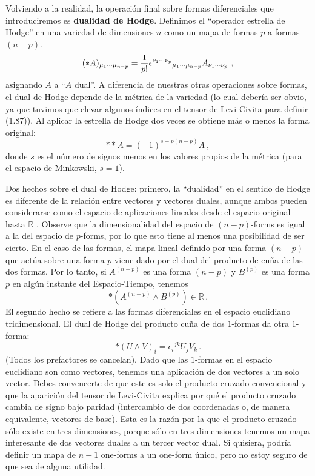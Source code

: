 \documentclass[11pt,b5paper,openany,twoside]{book}
\begin{document}
Volviendo a la realidad, la operación final sobre formas diferenciales que introduciremos es {\bf dualidad de Hodge}.
Definimos el ``operador estrella de Hodge'' en una variedad de dimensiones $n$ como un mapa de formas $p$ a formas $(n-p)$.
\begin{equation}
(*A)_{\mu_1\cdots\mu_{n-p}} = {1\over {p!}}
\epsilon^{\nu_1\cdots\nu_p}{}_{\mu_1\cdots\mu_{n-p}}
A_{\nu_1\cdots\nu_p}\ ,\label{1.87}
\end{equation}
asignando $A$ a ``$A$ dual''.
A diferencia de nuestras otras operaciones sobre formas, el dual de Hodge depende de la métrica de la variedad (lo cual debería ser obvio, ya que tuvimos que elevar algunos índices en el tensor de Levi-Civita para definir (1.87)).
Al aplicar la estrella de Hodge dos veces se obtiene más o menos la forma original:
\begin{equation}
**A = (-1)^{s+p(n-p)}A\ ,\label{1.88}
\end{equation}
donde $s$ es el número de signos menos en los valores propios de la métrica (para el espacio de Minkowski, $s=1$).

Dos hechos sobre el dual de Hodge: primero, la ``dualidad'' en el sentido de Hodge es diferente de la relación entre vectores y vectores duales, aunque ambos pueden considerarse como el espacio de aplicaciones lineales desde el espacio original hasta $\mathbb{R}$ .
Observe que la dimensionalidad del espacio de $(n-p)$-forms es igual a la del espacio de $p$-forms, por lo que esto tiene al menos una posibilidad de ser cierto.
En el caso de las formas, el mapa lineal definido por una forma $(n-p)$ que actúa sobre una forma $p$ viene dado por el dual del producto de cuña de las dos formas.
Por lo tanto, si $A^{(n-p)}$ es una forma $(n-p)$ y $B^{(p)}$ es una forma $p$ en algún instante del Espacio-Tiempo, tenemos
\begin{equation}
*(A^{(n-p)}\wedge B^{(p)}) \in \mathbb{R}\,.\label{1.89}
\end{equation}
El segundo hecho se refiere a las formas diferenciales en el espacio euclidiano tridimensional.
El dual de Hodge del producto cuña de dos $1$-formas da otra $1$-forma:
\begin{equation}
*(U\wedge V)_i = \epsilon_i{}^{jk}U_j V_k\,.\label{1.90}
\end{equation}
(Todos los prefactores se cancelan).
Dado que las $1$-formas en el espacio euclidiano son como vectores, tenemos una aplicación de dos vectores a un solo vector.
Debes convencerte de que este es solo el producto cruzado convencional y que la aparición del tensor de Levi-Civita explica por qué el producto cruzado cambia de signo bajo paridad (intercambio de dos coordenadas o, de manera equivalente, vectores de base).
Esta es la razón por la que el producto cruzado sólo existe en tres dimensiones, porque sólo en tres dimensiones tenemos un mapa interesante de dos vectores duales a un tercer vector dual.
Si quisiera, podría definir un mapa de $n-1$ one-forms a un one-form único, pero no estoy seguro de que sea de alguna utilidad.
\end{document}
